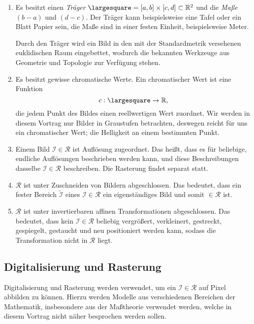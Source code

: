 \documentclass[afourpaper]{latex-classes/handout}
\begin{document}
\begin{enumerate}
  \item Es besitzt einen \emph{Träger} \( \largesquare = [a,b] \times [c,d] \subset \R^2 \) und die \emph{Maße} \( (b-a) \) und \( (d-c) \). Der Träger kann beispielsweise eine Tafel oder ein Blatt Papier sein, die Maße sind in einer festen Einheit, beispielsweise Meter.

  Durch den Träger wird ein Bild in den mit der Standardmetrik versehenen euklidischen Raum eingebettet, wodurch die bekannten Werkzeuge aus Geometrie und Topologie zur Verfügung stehen.

  \item Es besitzt gewisse chromatische Werte. Ein chromatischer Wert ist eine Funktion
  \begin{equation*}
    c: \largesquare \to \R\text{,}
  \end{equation*}
  die jedem Punkt des Bildes einen reellwertigen Wert zuordnet. Wir werden in diesem Vortrag nur Bilder in Graustufen betrachten, deswegen reicht für uns ein chromatischer Wert; die Helligkeit an einem bestimmten Punkt.

  \item Einem Bild \( \mathcal{I} \in \mathcal{R} \) ist  Auflösung zugeordnet. Das heißt, dass es für beliebige, endliche Auflösungen beschrieben werden kann, und diese Beschreibungen dasselbe \( \mathcal{I} \in \mathcal{R} \) beschreiben. Die Rasterung findet separat statt.

  \item \( \mathcal{R} \) ist unter Zuschneiden von Bildern abgeschlossen. Das bedeutet, dass ein fester Bereich \( \widetilde{\mathcal{I}} \) eines \( \mathcal{I} \in \mathcal{R} \) ein eigenständiges Bild und somit \( \in \mathcal{R} \) ist.

  \item \( \mathcal{R} \) ist unter invertierbaren affinen Transformationen abgeschlossen. Das bedeutet, dass kein \( \mathcal{I} \in \mathcal{R} \) beliebig vergrößert, verkleinert, gestreckt, gespiegelt, gestaucht und neu positioniert werden kann, sodass die Transformation nicht in \( \mathcal{R} \) liegt.
\end{enumerate}

\subsection{Digitalisierung und Rasterung}

Digitalisierung und Rasterung werden verwendet, um ein \( \mathcal{I} \in \mathcal{R} \) auf Pixel abbilden zu können. Hierzu werden Modelle aus verschiedenen Bereichen der Mathematik, insbesondere aus der Maßtheorie verwendet werden, welche in diesem Vortrag nicht näher besprochen werden sollen.
\end{document}
